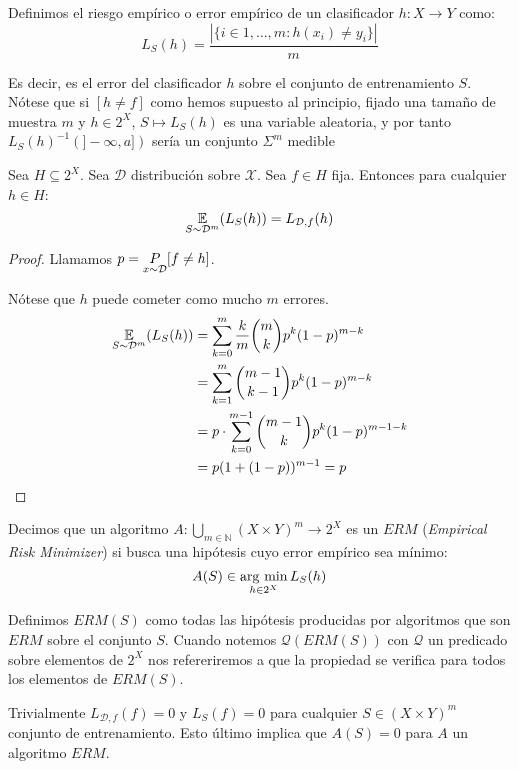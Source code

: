 \begin{definition}
Definimos el riesgo empírico o error empírico de un clasificador $h:X \rightarrow Y$ como:
\[
  L_S(h) = \frac{|\{i\in {1,\ldots, m}: h(x_i) \neq y_i\}|}{m}
\]
\end{definition}

Es decir, es el error del clasificador $h$ sobre el conjunto de entrenamiento $S$. Nótese que si $[h\neq f]$ como hemos
supuesto al principio, fijado una tamaño de muestra $m$ y $h\in 2^X$, $S \mapsto L_S(h)$ es una variable aleatoria, y por
tanto $L_S(h)^{-1}(]-\infty, a])$ sería un conjunto $\Sigma^m$ medible

\begin{fact}
Sea $H\subseteq 2^X$. Sea $\mathcal{D}$ distribución sobre $\mathcal{X}$. Sea $f \in H$ fija. Entonces para
cualquier $h\in H$:
\[
  \underset{S\sim \mathcal{D}^m}{\mathbb{E}}(L_S(h)) = L_{\mathcal{D},f}(h)
\]
\label{fact:expect-error}
\end{fact}

  \begin{proof}
   Llamamos $p= \underset{x\sim \mathcal{D}}{P} [f\neq h]$.

   Nótese que $h$ puede cometer como mucho $m$ errores.
   \begin{align*}
   \underset{S\sim \mathcal{D}^m}{\mathbb{E}}(L_S(h)) &= \sum_{k=0}^m \frac{k}{m} \binom{m}{k} p^k(1-p)^{m-k}\\
                    &= \sum_{k=1}^m \binom{m-1}{k-1} p^k(1-p)^{m-k} \\
                    &= p\cdot \sum_{k=0}^{m-1} \binom{m-1}{k} p^{k}(1-p)^{m-1-k}\\
                    &= p(1+(1-p))^{m-1} = p
   \end{align*}
  \end{proof}


\begin{definition}
Decimos que un algoritmo $A: \underset{m\in \mathbb{N}}{\bigcup} (X\times Y)^m \rightarrow 2^{X}$ es un $ERM$ 
(\textit{Empirical Risk Minimizer}) si busca una hipótesis cuyo error empírico sea mínimo:
\[
  A(S) \in \operatorname*{arg\,\min}_{h\in 2^X} L_S(h)
\]
\end{definition}

Definimos $ERM(S)$ como todas las hipótesis producidas por algoritmos que son $ERM$
sobre el conjunto $S$. Cuando notemos $\mathcal{Q}(ERM(S))$ con $\mathcal{Q}$ un predicado sobre elementos 
de $2^X$ nos refereriremos a que la propiedad se verifica para todos los elementos de $ERM(S)$.

Trivialmente $L_{\mathcal{D},f}(f) = 0$ y $L_S(f) = 0$ para cualquier $S \in (X \times Y)^m$ conjunto de entrenamiento.
Esto último implica que $A(S) = 0$ para $A$ un algoritmo $ERM$.

